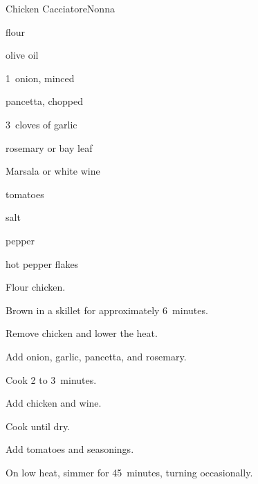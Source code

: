 \begin{recipe}{Chicken Cacciatore}{Nonna}{}

\begin{ingredients}
\item flour
\item \C{\quarter} olive oil
\item 1~onion, minced
\item {} pancetta, chopped
\item 3~cloves of garlic
\item {} rosemary or bay leaf
\item {} Marsala or white wine
\item {} tomatoes
\item salt
\item pepper
\item hot pepper flakes
\end{ingredients}

\begin{directions}
\item Flour chicken.
\item Brown in a skillet for approximately 6~minutes.
\item Remove chicken and lower the heat.
\item Add onion, garlic, pancetta, and rosemary.
\item Cook 2 to 3~minutes.
\item Add chicken and wine.
\item Cook until dry.
\item Add tomatoes and seasonings.
\item On low heat, simmer for 45~minutes, turning occasionally.
\end{directions}

\end{recipe}
